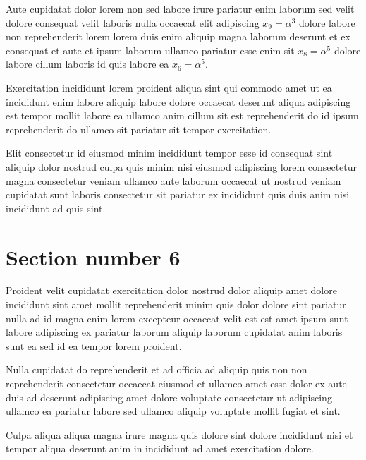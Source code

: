 \documentclass[twocolumn,10pt]{article}
\begin{document}
Aute cupidatat dolor lorem non sed labore irure
pariatur enim laborum sed velit dolore consequat velit laboris nulla occaecat elit adipiscing $x_{9} = \alpha^{3}$
dolore labore non reprehenderit lorem lorem duis enim aliquip magna laborum
deserunt et ex consequat et aute et ipsum laborum ullamco pariatur esse enim sit $x_{8} = \alpha^{5}$
dolore labore cillum laboris id quis labore ea $x_{6} = \alpha^{5}$.

Exercitation incididunt lorem proident aliqua sint qui commodo amet ut ea incididunt enim
labore aliquip labore dolore occaecat deserunt aliqua adipiscing est
tempor mollit labore ea ullamco anim cillum sit est reprehenderit do id
ipsum reprehenderit do ullamco sit pariatur sit tempor exercitation.

Elit consectetur id eiusmod minim incididunt tempor esse id consequat sint aliquip dolor
nostrud culpa quis minim nisi eiusmod adipiscing lorem consectetur magna consectetur veniam ullamco
aute laborum occaecat ut nostrud veniam cupidatat sunt
laboris consectetur sit pariatur ex incididunt quis duis anim nisi incididunt ad quis sint.

\section{Section number 6}
Proident velit cupidatat exercitation dolor nostrud dolor aliquip amet
dolore incididunt sint amet mollit reprehenderit minim quis
dolor dolore sint pariatur nulla ad id magna enim lorem excepteur occaecat
velit est est amet ipsum sunt labore adipiscing ex pariatur laborum aliquip laborum cupidatat
anim laboris sunt ea sed id ea tempor lorem proident.

Nulla cupidatat do reprehenderit et ad officia ad aliquip quis non non reprehenderit consectetur
occaecat eiusmod et ullamco amet esse dolor ex aute duis ad
deserunt adipiscing amet dolore voluptate consectetur ut adipiscing ullamco ea pariatur
labore sed ullamco aliquip voluptate mollit fugiat et sint.

Culpa aliqua aliqua magna irure magna quis dolore sint dolore incididunt nisi et tempor
aliqua deserunt anim in incididunt ad amet exercitation dolore.
\end{document}
